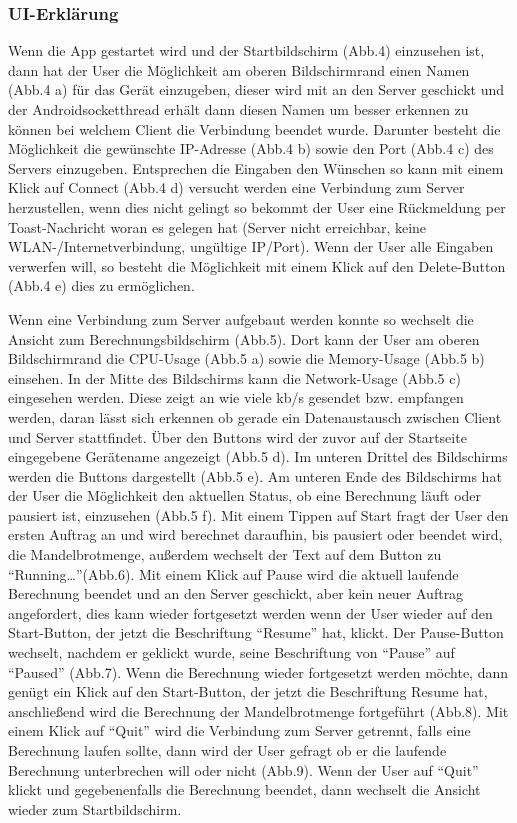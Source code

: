 \documentclass[12pt, onecolumn, notitlepage]{scrartcl}
\begin{document}
\subsubsection{UI-Erklärung}
Wenn die App gestartet wird und der Startbildschirm (Abb.4) einzusehen ist, dann hat der User die Möglichkeit am oberen Bildschirmrand einen Namen (Abb.4 a) für das Gerät einzugeben, dieser wird mit an den Server geschickt und der Androidsocketthread erhält dann diesen Namen um besser erkennen zu können bei welchem Client die Verbindung beendet wurde. Darunter besteht die Möglichkeit die gewünschte IP-Adresse (Abb.4 b) sowie den Port (Abb.4 c) des Servers einzugeben. Entsprechen die Eingaben den Wünschen so kann mit einem Klick auf Connect (Abb.4 d) versucht werden eine Verbindung zum Server herzustellen, wenn dies nicht gelingt so bekommt der User eine Rückmeldung per Toast-Nachricht woran es gelegen hat (Server nicht erreichbar, keine WLAN-/Internetverbindung, ungültige IP/Port). Wenn der User alle Eingaben verwerfen will, so besteht die Möglichkeit mit einem Klick auf den Delete-Button (Abb.4 e) dies zu ermöglichen. \par
Wenn eine Verbindung zum Server aufgebaut werden konnte so wechselt die Ansicht zum Berechnungsbildschirm (Abb.5). Dort kann der User am oberen Bildschirmrand die CPU-Usage (Abb.5 a) sowie die Memory-Usage (Abb.5 b) einsehen. In der Mitte des Bildschirms kann die Network-Usage (Abb.5 c) eingesehen werden. Diese zeigt an wie viele kb/s gesendet bzw. empfangen werden, daran lässt sich erkennen ob gerade ein Datenaustausch zwischen Client und Server stattfindet. Über den Buttons wird der zuvor auf der Startseite eingegebene Gerätename angezeigt (Abb.5 d). Im unteren Drittel des Bildschirms werden die Buttons dargestellt (Abb.5 e). Am unteren Ende des Bildschirms hat der User die Möglichkeit den aktuellen Status, ob eine Berechnung läuft oder pausiert ist, einzusehen (Abb.5 f). Mit einem Tippen auf Start fragt der User den ersten Auftrag an und wird berechnet daraufhin, bis pausiert oder beendet wird, die Mandelbrotmenge, außerdem wechselt der Text auf dem Button zu \enquote{Running…}(Abb.6). Mit einem Klick auf Pause wird die aktuell laufende Berechnung beendet und an den Server geschickt, aber kein neuer Auftrag angefordert, dies kann wieder fortgesetzt werden wenn der User wieder auf den Start-Button, der jetzt die Beschriftung \enquote{Resume} hat, klickt. Der Pause-Button wechselt, nachdem er geklickt wurde, seine Beschriftung von \enquote{Pause} auf \enquote{Paused} (Abb.7). Wenn die Berechnung wieder fortgesetzt werden möchte, dann genügt ein Klick auf den Start-Button, der jetzt die Beschriftung Resume hat, anschließend wird die Berechnung der Mandelbrotmenge fortgeführt (Abb.8). Mit einem Klick auf \enquote{Quit} wird die Verbindung zum Server getrennt, falls eine Berechnung laufen sollte, dann wird der User gefragt ob er die laufende Berechnung unterbrechen will oder nicht (Abb.9). Wenn der User auf \enquote{Quit} klickt und gegebenenfalls die Berechnung beendet, dann wechselt die Ansicht wieder zum Startbildschirm. \\ \\
\end{document}
